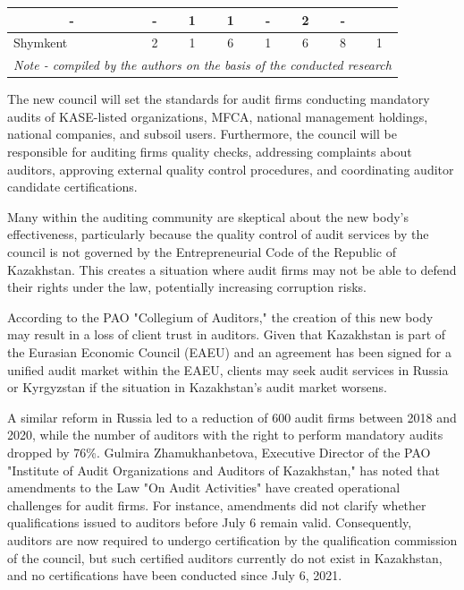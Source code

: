 \begin{table}[H]
{\begin{tabular}{|lccccccc|}
  \multicolumn{1}{c|}{-} &
  \multicolumn{1}{c|}{-} &
  \multicolumn{1}{c|}{1} &
  \multicolumn{1}{c|}{1} &
  \multicolumn{1}{c|}{-} &
  \multicolumn{1}{c|}{2} &
  - \\ \hline
\multicolumn{1}{|l|}{Shymkent} &
  \multicolumn{1}{c|}{2} &
  \multicolumn{1}{c|}{1} &
  \multicolumn{1}{c|}{6} &
  \multicolumn{1}{c|}{1} &
  \multicolumn{1}{c|}{6} &
  \multicolumn{1}{c|}{8} &
  1 \\ \hline
\multicolumn{8}{|l|}{\textit{Note - compiled by the authors on the basis of the conducted research}} \\ \hline
\end{tabular}%
}
\end{table}

\begin{multicols}{2}


The new council will set the standards for audit firms conducting
mandatory audits of KASE-listed organizations, MFCA, national management
holdings, national companies, and subsoil users. Furthermore, the
council will be responsible for auditing firms\textquotesingle{} quality
checks, addressing complaints about auditors, approving external quality
control procedures, and coordinating auditor candidate certifications.

Many within the auditing community are skeptical about the new body's
effectiveness, particularly because the quality control of audit
services by the council is not governed by the Entrepreneurial Code of
the Republic of Kazakhstan. This creates a situation where audit firms
may not be able to defend their rights under the law, potentially
increasing corruption risks.

According to the PAO "Collegium of Auditors," the creation of this new
body may result in a loss of client trust in auditors. Given that
Kazakhstan is part of the Eurasian Economic Council (EAEU) and an
agreement has been signed for a unified audit market within the EAEU,
clients may seek audit services in Russia or Kyrgyzstan if the situation
in Kazakhstan's audit market worsens.

A similar reform in Russia led to a reduction of 600 audit firms between
2018 and 2020, while the number of auditors with the right to perform
mandatory audits dropped by 76\%. Gulmira Zhamukhanbetova, Executive
Director of the PAO "Institute of Audit Organizations and Auditors of
Kazakhstan," has noted that amendments to the Law "On Audit Activities"
have created operational challenges for audit firms. For instance,
amendments did not clarify whether qualifications issued to auditors
before July 6 remain valid. Consequently, auditors are now required to
undergo certification by the qualification commission of the council,
but such certified auditors currently do not exist in Kazakhstan, and no
certifications have been conducted since July 6, 2021.


\end{multicols}
